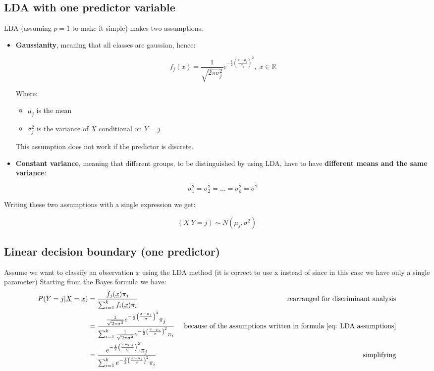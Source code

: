     \subsection{LDA with one predictor variable}
      LDA (assuming $p=1$ to make it simple) makes two assumptions:
      \begin{itemize}
        \item \textbf{Gaussianity}, meaning that all classes are gaussian,
        hence:

        $$f_j(x) = \frac{1}{\sqrt{2\pi\sigma^2_j}}
        e^{-\frac{1}{2}\left(\frac{x-\mu_i}{\sigma_j}\right)^2},\;x\in\mathbb{R}$$

        Where:
        \begin{itemize}
          \item $\mu_j$ is the mean
          \item $\sigma_j^2$ is the variance of $X$ conditional on $Y=j$
        \end{itemize}
        
        This assumption does not work if the predictor is discrete.

        \item \textbf{Constant variance}, meaning that different groups, to be
        distinguished by using LDA, have to have \textbf{different means and the
        same variance}:

        $$\sigma_1^2 = \sigma_2^2 = \dots = \sigma_k^2 = \sigma^2$$

      \end{itemize}

      Writing these two assumptions with a single expression we get:
      
      \begin{equation} \label{eq: LDA assumptions}
        (X|Y = j) \sim N(\mu_j, \sigma^2)
      \end{equation}

    \subsection{Linear decision boundary (one predictor)}
      Assume we want to classify an observation $x$ using the LDA method (it is
      correct to use x instead of  since in this case we have only a
      single parameter) Starting from the Bayes formula we have:
        \begin{align*}
        P(Y=j|\vec{X}=\vec{x})  
          &= \frac{f_j(\vec{x})\pi_j}{\sum_{i = 1}^k f_i(\vec{x})\pi_i}
          & \text{ rearranged for discriminant analysis}\\
          &= \frac
          {\frac{1}{\sqrt{2\pi\sigma^2}} e^{-\frac{1}{2}\left(\frac{x-\mu_j}{\sigma}\right)^2}\pi_j}
          {\sum_{i = 1}^k\frac{1}{\sqrt{2\pi\sigma^2}} e^{-\frac{1}{2}\left(\frac{x-\mu_i}{\sigma}\right)^2}\pi_i}
          & \text{ because of the assumptions written in formula \ref{eq: LDA assumptions}}\\
          &= \frac
          {e^{-\frac{1}{2}\left(\frac{x-\mu_j}{\sigma}\right)^2}\pi_j}
          {\sum_{i = 1}^k e^{-\frac{1}{2}\left(\frac{x-\mu_i}{\sigma}\right)^2}\pi_i}
          & \text{ simplifying}
        \end{align*}


